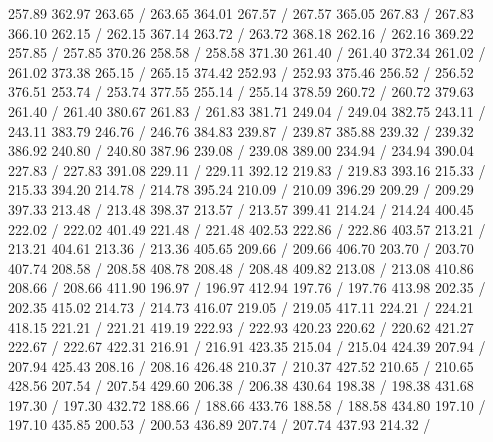 { 257.89 362.97 263.65 /
 263.65 364.01 267.57 /
 267.57 365.05 267.83 /
 267.83 366.10 262.15 /
 262.15 367.14 263.72 /
 263.72 368.18 262.16 /
 262.16 369.22 257.85 /
 257.85 370.26 258.58 /
 258.58 371.30 261.40 /
 261.40 372.34 261.02 /
 261.02 373.38 265.15 /
 265.15 374.42 252.93 /
 252.93 375.46 256.52 /
 256.52 376.51 253.74 /
 253.74 377.55 255.14 /
 255.14 378.59 260.72 /
 260.72 379.63 261.40 /
 261.40 380.67 261.83 /
 261.83 381.71 249.04 /
 249.04 382.75 243.11 /
 243.11 383.79 246.76 /
 246.76 384.83 239.87 /
 239.87 385.88 239.32 /
 239.32 386.92 240.80 /
 240.80 387.96 239.08 /
 239.08 389.00 234.94 /
 234.94 390.04 227.83 /
 227.83 391.08 229.11 /
 229.11 392.12 219.83 /
 219.83 393.16 215.33 /
 215.33 394.20 214.78 /
 214.78 395.24 210.09 /
 210.09 396.29 209.29 /
 209.29 397.33 213.48 /
 213.48 398.37 213.57 /
 213.57 399.41 214.24 /
 214.24 400.45 222.02 /
 222.02 401.49 221.48 /
 221.48 402.53 222.86 /
 222.86 403.57 213.21 /
 213.21 404.61 213.36 /
 213.36 405.65 209.66 /
 209.66 406.70 203.70 /
 203.70 407.74 208.58 /
 208.58 408.78 208.48 /
 208.48 409.82 213.08 /
 213.08 410.86 208.66 /
 208.66 411.90 196.97 /
 196.97 412.94 197.76 /
 197.76 413.98 202.35 /
 202.35 415.02 214.73 /
 214.73 416.07 219.05 /
 219.05 417.11 224.21 /
 224.21 418.15 221.21 /
 221.21 419.19 222.93 /
 222.93 420.23 220.62 /
 220.62 421.27 222.67 /
 222.67 422.31 216.91 /
 216.91 423.35 215.04 /
 215.04 424.39 207.94 /
 207.94 425.43 208.16 /
 208.16 426.48 210.37 /
 210.37 427.52 210.65 /
 210.65 428.56 207.54 /
 207.54 429.60 206.38 /
 206.38 430.64 198.38 /
 198.38 431.68 197.30 /
 197.30 432.72 188.66 /
 188.66 433.76 188.58 /
 188.58 434.80 197.10 /
 197.10 435.85 200.53 /
 200.53 436.89 207.74 /
 207.74 437.93 214.32 /
}
